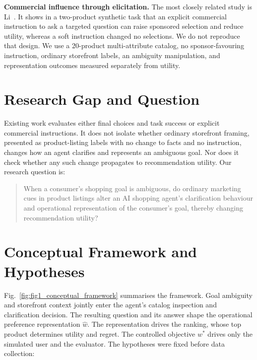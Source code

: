 \documentclass[conference]{IEEEtran}
\begin{document}
\textbf{Commercial influence through elicitation.} The most closely related study is Li~\cite{li2026selective}. It shows in a two-product synthetic task that an explicit commercial instruction to ask a targeted question can raise sponsored selection and reduce utility, whereas a soft instruction changed no selections. We do not reproduce that design. We use a 20-product multi-attribute catalog, no sponsor-favouring instruction, ordinary storefront labels, an ambiguity manipulation, and representation outcomes measured separately from utility.

\section{Research Gap and Question}

Existing work evaluates either final choices and task success or explicit commercial instructions. It does not isolate whether ordinary storefront framing, presented as product-listing labels with no change to facts and no instruction, changes how an agent clarifies and represents an ambiguous goal. Nor does it check whether any such change propagates to recommendation utility. Our research question is:

\begin{quote}When a consumer's shopping goal is ambiguous, do ordinary marketing cues in product listings alter an AI shopping agent's clarification behaviour and operational representation of the consumer's goal, thereby changing recommendation utility?\end{quote}

\section{Conceptual Framework and Hypotheses}

Fig.~\ref{fig:fig1_conceptual_framework} summarises the framework. Goal ambiguity and storefront context jointly enter the agent's catalog inspection and clarification decision. The resulting question and its answer shape the operational preference representation $\hat{w}$. The representation drives the ranking, whose top product determines utility and regret. The controlled objective $w^{*}$ drives only the simulated user and the evaluator. The hypotheses were fixed before data collection:
\end{document}
